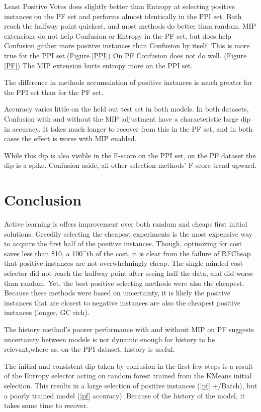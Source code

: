 \documentclass[10pt,a4pape r]{article}
\begin{document}
Least Positive Votes does slightly better than Entropy at selecting positive instances on the PF set and performs almost identically in the PPI set. Both reach the halfway point quickest, and most methods do better than random. MIP extensions do not help Confusion or Entropy in the PF set, but does help Confusion gather more positive instances than Confusion by itself. This is more true for the PPI set.(Figure \ref{PPI}) On PF  Confusion does not do well. (Figure \ref{PF}) The MIP extension hurts entropy more on the PPI set.
 
 The difference in methods accumulation of positive instances is much greater for the PPI set than for the PF set.

 Accuracy varies little on the held out test set in both models. In both datasets, Confusion with and without the MIP adjustment have a characteristic large dip in accuracy. It takes much longer to recover from this in the PF set, and in both cases the effect is worse with MIP enabled.
 
 While this dip is also visible in the F-score on the PPI set, on the PF dataset the dip is a spike. Confusion aside, all other selection methods' F-score trend upward.


 \section{Conclusion}
Active learning is offers improvement over both random and cheaps first initial solutions. Greedily selecting the cheapest experiments is the most expensive way to acquire the first half of the positive instances. Though, optimizing for cost saves less than \$10, a 100^{th} of the cost, it is clear from the failure of RFCheap that positive instances are not overwhelmingly cheap. The single minded cost selector did not reach the halfway point after seeing half the data, and did worse than random. Yet, the best positive selecting methods were also the cheapest. Because these methods were based on uncertainty, it is likely the positive instances that are closest to negative instances are also the cheapest positive instances (longer, GC rich). 


 The history method's poorer performance with and without MIP on PF suggests uncertainty between models is not dynamic enough for history to be relevant,where as, on the PPI dataset, history is useful.

 The initial and consistent dip taken by confusion in the first few steps is a result of the Entropy selector acting on random forest trained from the KMeans initial selection. This results in a large selection of positive instances (\ref{pf} +/Batch), but a poorly trained model (\ref{pf} accuracy). Because of the history of the model, it takes some time to recover.
\end{document}
